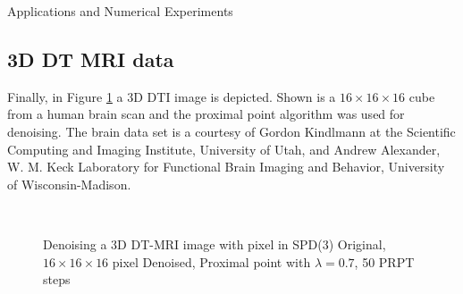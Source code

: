 \begin{chapter}{Applications and Numerical Experiments}
\FloatBarrier
\subsection{3D DT MRI data} %
\label{sub:3DDTMRIdata}

Finally, in Figure \ref{fig:application_dti2} a 3D DTI image is depicted. Shown is a $16\times 16\times 16$ cube from a human brain scan and the proximal point algorithm was used for denoising. 
The brain data set is a courtesy of Gordon Kindlmann at the Scientific Computing and Imaging Institute, University of Utah, 
and Andrew Alexander, W. M. Keck Laboratory for Functional Brain Imaging and Behavior, University of Wisconsin-Madison. 
\begin{figure}[h!]
    \centering
    \\
    \caption[Denoising 3D DTI-MRI data]{Denoising a 3D DT-MRI image with pixel in SPD(3)
	 Original, $16\times 16\times 16$ pixel 
	 Denoised, Proximal point with $\lambda=0.7$, 50 PRPT steps
	\label{fig:application_dti2}
    }
\end{figure}


\end{chapter}
